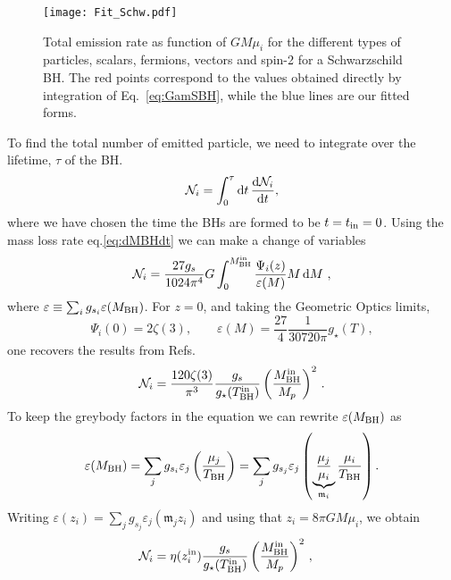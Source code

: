 \documentclass[aps,prd,reprint,twocolumn,preprintnumbers,floatfix,nofootinbib]{revtex4-1}
\newcommand{\TBH}{T_{\rm BH}}
\newcommand{\MBH}{M_{\rm BH}}
\newcommand{\MPL}{M_p}
\begin{document}
\begin{figure*}[t!]
 \texttt{[image: Fit\_Schw.pdf]}
 \caption{Total emission rate as function of $GM\mu_i$ for the different types of particles, scalars, fermions, vectors and spin-2 for a Schwarzschild BH. The red points correspond to the values obtained directly by integration of Eq.~\eqref{eq:GamSBH}, while the blue lines are our fitted forms. \label{fig:fitS}}
\end{figure*}
To find the total number of emitted particle, we need to integrate over the lifetime, $\tau$ of the BH. 
\begin{equation}
    \mathcal{N}_i=\int_0^{\tau}\dd{t}\dv{\mathcal{N}_i}{t},
\end{equation}
where we have chosen the time the BHs are formed to be $t=t_{\rm in}=0$. Using the mass loss rate eq.\eqref{eq:dMBHdt} we can make a change of variables 
\begin{equation}
    \mathcal{N}_i = \frac{27g_s}{1024\pi^4} G \int_{0}^{\MBH^{\rm in}}\frac{\Psi_i(z)}{\varepsilon(M)} M\dd{M}\,,
\end{equation}
where $\varepsilon\equiv \sum_i g_{s_i}\varepsilon(\MBH)$. For $z=0$, and taking the Geometric Optics limits, 
\begin{equation}
    \Psi_i(0)=2\zeta(3),\quad\quad \varepsilon(M)=\frac{27}{4}\frac{1}{30720\pi}g_{\star}(T),
\end{equation}
one recovers the results from Refs.~\cite{Baldes:2020nuv,Gondolo:2020uqv}
\begin{align}
    \mathcal{N}_i=\frac{120\zeta(3)}{\pi^3}\frac{g_s}{g_{\star}(\TBH^{\rm in})}\left(\frac{\MBH^{\rm in}}{\MPL}\right)^2\,.
\end{align}
To keep the greybody factors in the equation we can rewrite $\varepsilon(\MBH)$ as
\begin{equation}
    \varepsilon(\MBH)= \sum_j g_{s_i}\varepsilon_j\left(\frac{\mu_j}{\TBH}\right)=\sum_j g_{s_j}\varepsilon_{j}\left(\underbrace{\frac{\mu_j}{\mu_i}}_{\mathfrak{m}_i}\frac{\mu_i}{\TBH}\right).
\end{equation}
Writing $\varepsilon(z_i) = \sum_j g_{s_j}\varepsilon_j(\mathfrak{m}_j z_i)$ and using that $z_i=8\pi G M \mu_i$, we obtain
\begin{align}
    \mathcal{N}_i 
    &= \eta(z_i^{\rm in})\frac{g_s}{g_{\star}(\TBH^{\rm in})} \left(\frac{\MBH^{\rm in}}{\MPL}\right)^2\,,
\end{align}
\end{document}
